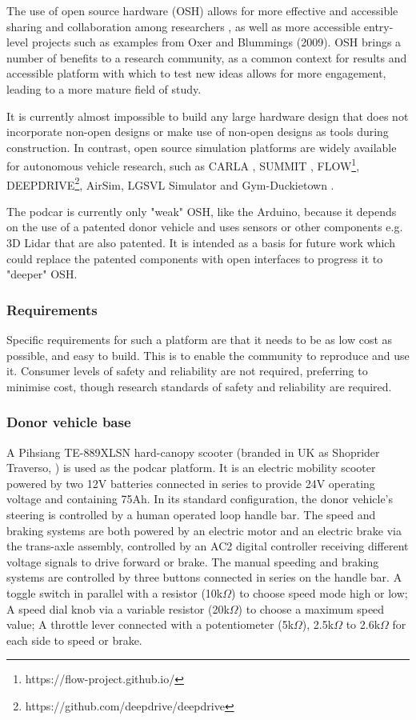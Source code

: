 \documentclass[a4paper]{article}
\begin{document}
The use of open source hardware (OSH) allows for more effective and accessible sharing and collaboration among researchers \cite{fisher2012open}, as well as more accessible entry-level projects such as examples from Oxer and Blummings (2009). OSH brings a number of benefits to a research community, as a common context for results and accessible platform with which to test new ideas allows for more engagement, leading to a more mature field of study.

It is currently almost impossible to build any large hardware design that does not incorporate non-open designs or make use of non-open designs as tools during construction. In contrast, open source simulation platforms are widely available for autonomous vehicle research, such as CARLA \cite{dosovitskiy2017carla}, SUMMIT \cite{cai2020summit}, FLOW\footnote{https://flow-project.github.io/}, DEEPDRIVE\footnote{https://github.com/deepdrive/deepdrive}, AirSim\cite{shah2017airsim}, LGSVL Simulator \cite{rong2020lgsvl} and Gym-Duckietown \cite{chevalier-boisvert2018duckietown}.

The podcar is currently only "weak" OSH, like the Arduino, because it depends on the use of a patented donor vehicle and uses sensors or other components e.g. 3D Lidar that are also patented. It is intended as a basis for future work which could replace the patented components with open interfaces to progress it to "deeper" OSH.


\subsubsection{Requirements}
Specific requirements for such a platform are that it needs to be as low cost as possible, and easy to build.  This is to enable the community to reproduce and use it. Consumer levels of safety and reliability are not required, preferring to minimise cost, though research standards of safety and reliability are required.

\subsubsection{Donor vehicle base}    
A Pihsiang TE-889XLSN hard-canopy scooter (branded in UK as Shoprider Traverso, \cite{shoprider2006}) is used as the podcar platform. It is an electric mobility scooter powered by two 12V batteries connected in series to provide 24V operating voltage and containing 75Ah. In its standard configuration, the donor vehicle’s steering is controlled by a human operated loop handle bar. The speed and braking systems are both powered by an electric motor and an electric brake via the trans-axle assembly, controlled by an AC2 digital controller receiving different voltage signals to drive forward or brake. The manual speeding and braking systems are controlled by three buttons connected in series on the handle bar.  A toggle switch in parallel with a resistor (10k$\Omega$) to choose speed mode high or low; A speed dial knob via a variable resistor (20k$\Omega$) to choose a maximum speed value; A throttle lever connected with a potentiometer (5k$\Omega$), 2.5k$\Omega$ to 2.6k$\Omega$ for each side to speed or brake. 
\end{document}
